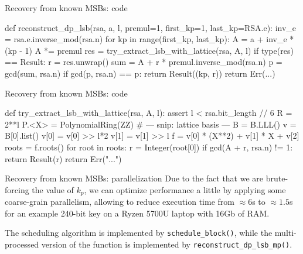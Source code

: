 \documentclass[usepdftitle=false]{beamer}
\begin{document}
\begin{frame}[fragile=singleslide]{Recovery from known MSBs: code}
\begin{python}
def reconstruct_dp_lsb(rsa, a, l, premul=1,
                       first_kp=1, last_kp=RSA.e):
  inv_e = rsa.e.inverse_mod(rsa.n)
  for kp in range(first_kp, last_kp):
    A = a + inv_e * (kp - 1)
    A *= premul
    res = try_extract_lsb_with_lattice(rsa, A, l)
    if type(res) == Result:
      r = res.unwrap()
      sum = A + r * premul.inverse_mod(rsa.n)
      p = gcd(sum, rsa.n)
      if gcd(p, rsa.n) == p:
        return Result((kp, r))
  return Err(...)
\end{python}
\end{frame}
\begin{frame}[fragile=singleslide]{Recovery from known MSBs: code}
\begin{python}
def try_extract_lsb_with_lattice(rsa, A, l):
  assert l < rsa.bit_length // 6
  R = 2**l
  P.<X> = PolynomialRing(ZZ)
  # --- snip: lattice basis ---
  B = B.LLL()
  v = B[0].list()
  v[0] = v[0] >> l*2
  v[1] = v[1] >> l
  f = v[0] * (X**2) + v[1] * X + v[2]
  roots = f.roots()
  for root in roots:
    r = Integer(root[0])
    if gcd(A + r, rsa.n) != 1:
      return Result(r)
  return Err("...")
\end{python}
\end{frame}
\begin{frame}{Recovery from known MSBs: parallelization}
Due to the fact that we are brute-forcing the value of $k_p$, we can optimize performance a little
by applying some coarse-grain parallelism, allowing to reduce execution time from $\approx 6$s to
$\approx 1.5$s for an example 240-bit key on a Ryzen 5700U laptop with 16Gb of RAM.

\vspace{10pt}

The scheduling algorithm is implemented by \texttt{schedule\_block()}, while the multi-processed
version of the function is implemented by \texttt{reconstruct\_dp\_lsb\_mp()}.
\end{frame}
\end{document}
